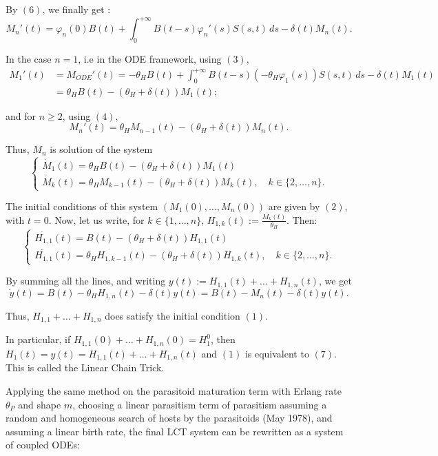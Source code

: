 \documentclass[12pt,a4paper,onecolumn]{article}
\begin{document}
By $(6)$, we finally get :
\[
M_n'(t) = \varphi_n(0) B(t) + \int_0^{+\infty} B(t-s)\varphi_n'(s) S(s,t) \, ds - \delta(t) M_n(t).
\]

In the case $n = 1$, i.e in the ODE framework, using $(3)$,
\begin{align*}
M_{1}'(t) &= M_{ODE}'(t)= -\theta_H B(t) + \int_0^{+\infty} B(t-s)(-\theta_H \varphi_1(s)) S(s,t) \, ds - \delta(t) M_1(t) \\
&= \theta_H B(t) - (\theta_H + \delta(t)) M_1(t) ;
\end{align*}

and for $n \geq 2$, using $(4)$,
\[
M_n'(t) = \theta_H M_{n-1}(t) - (\theta_H + \delta(t)) M_n(t).
\]

Thus, \(M_n\) is solution of the system 
\begin{equation}
\begin{cases}
\dot{M}_1(t) = \theta_H B(t) - (\theta_H + \delta(t)) M_1(t) \\
\dot{M}_k(t) = \theta_H M_{k-1}(t) - (\theta_H + \delta(t)) M_k(t), \quad k \in \{2, \dots, n\}.
\end{cases}
\end{equation}

The initial conditions of this system  $(M_1(0), \dots, M_n(0))$ are given by $(2)$, with $t = 0$.
Now, let us write, for \(k \in \{1, \dots, n\}\), $H_{1,k}(t) := \frac{M_k(t)}{\theta_H}$. Then:
\begin{equation}
\begin{cases}
\dot{H_{1,1}}(t) = B(t) - (\theta_H + \delta(t)) H_{1,1}(t) \\
\dot{H_{1,1}}(t) = \theta_H H_{1, k-1}(t) - (\theta_H + \delta(t)) H_{1,k}(t), \quad k \in \{2, \dots, n\}.
\end{cases}
\end{equation}

By summing all the lines, and writing $y(t) := H_{1,1}(t) + \dots + H_{1,n}(t)$, we get 
\[
\dot{y}(t) = B(t) - \theta_H H_{1,n}(t) - \delta(t) y(t) = B(t) - M_n(t) - \delta(t) y(t).
\]

Thus, $H_{1,1} + \dots + H_{1,n}$ does satisfy the initial condition $(1)$.

In particular, if $H_{1,1}(0) + \dots + H_{1,n}(0) =  H_1^0$, then $H_1(t) = y(t) = H_{1,1}(t) + \dots + H_{1,n}(t)$ and $(1)$ is equivalent to $(7)$. This is called the Linear Chain Trick.

Applying the same method on the parasitoid maturation term with Erlang rate $\theta_P$ and shape $m$, choosing a linear parasitism term of parasitism assuming a random and homogeneous search of hosts by the parasitoids (May 1978), and assuming a linear birth rate, the final LCT system can be rewritten as a system of coupled ODEs:
\end{document}
